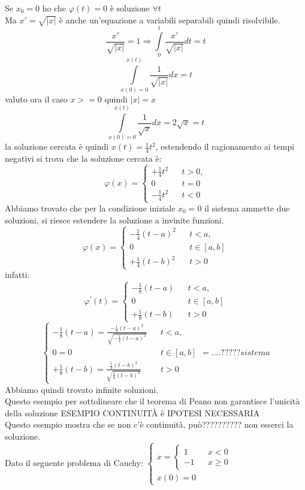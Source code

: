 Se $x_0 = 0$ ho che $\varphi(t)=0$ è soluzione $\forall t$\\
Ma $ x' = \sqrt{|x|}$ è anche un'equazione a variabili separabili quindi risolvibile.\\
$$\frac{ x'}{\sqrt{|x|}}=1 \Rightarrow \int\limits_{0}^{t}{\frac{ x'}{\sqrt{|x|}}dt} = t$$
$$\int\limits_{x(0)=0}^{x(t)}{\frac{1}{\sqrt{|x|}}dx} = t$$
valuto ora il caso $x>=0$ quindi $|x|=x$
$$ \int\limits_{x(0)=0}^{x(t)}{\frac{1}{\sqrt{x}}dx} = 2\sqrt{x} = t$$ 
la soluzione cercata è quindi $x(t)=\frac{1}{4}t^2$, 
estendendo il ragionamento ai tempi negativi si trova che la soluzione cercata è: $$\varphi(x)= \left\{\begin{matrix}+\frac{1}{4}t^2&&t>0,\\0&&t=0\\-\frac{1}{4}t^2&&t<0\end{matrix}\right.$$ 
Abbiamo trovato che per la condizione iniziale $x_0=0$ il sistema ammette due soluzioni, si riesce estendere la soluzione a invinite funzioni.
$$\varphi(x)= \left\{\begin{matrix}-\frac{1}{4}(t-a)^2&&t<a,\\0&&t\in[a,b]\\+\frac{1}{4}(t-b)^2&&t>0\end{matrix}\right.$$
infatti:
$$\varphi^{'}(t) = \left\{\begin{matrix}-\frac{1}{8}(t-a)&&t<a,\\0&&t\in[a,b]\\+\frac{1}{8}(t-b)&&t>0\end{matrix}\right.$$ $$\left\{\begin{matrix}-\frac{1}{8}(t-a)=\frac{-\frac{1}{4}(t-a)^2}{	\sqrt{-\frac{1}{4}(t-a)^2}}&&t<a,\\0=0&&t\in[a,b]\\+\frac{1}{8}(t-b)=\frac{\frac{1}{4}(t-b)^2}{\sqrt{\frac{1}{4}(t-b)^2}}&&t>0\end{matrix}\right. = ....????? sistema $$
Abbiamo quindi trovato infinite soluzioni.\\
Questo esempio per sottolineare che il teorema di Peano non garantisce l'unicità della soluzione
ESEMPIO CONTINUITÀ è IPOTESI NECESSARIA\\
Questo esempio mostra che se non c'è continuità, può?????????? non esserci la soluzione.\\
Dato il seguente problema di Cauchy: $\left\{\begin{matrix}
\dot{x} = \left\{\begin{matrix}1&&x<0\\-1&&x\ge 0\end{matrix}\right.\\
x(0)=0
\end{matrix}\right.$\\
